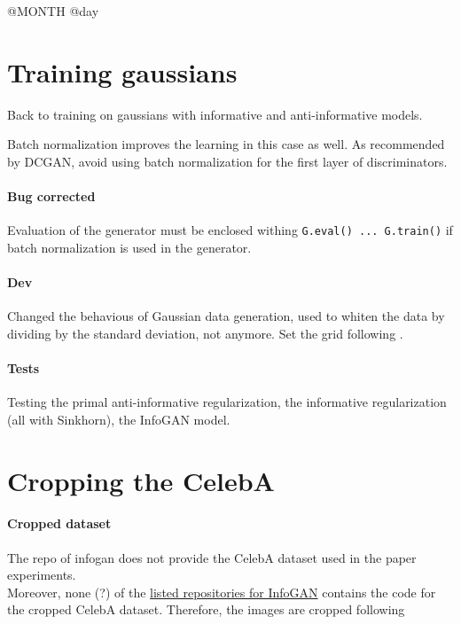 \documentclass[11pt,a4paper]{article}
\begin{document}

{\Huge @MONTH @day}

\section*{Training gaussians}

Back to training on gaussians with informative and anti-informative models.

Batch normalization improves the learning in this case as well. As recommended by DCGAN, avoid using batch normalization for the first layer of discriminators.

\paragraph{Bug corrected} Evaluation of the generator must be enclosed withing \texttt{G.eval() ... G.train()} if batch normalization is used in the generator.

\paragraph{Dev} Changed the behavious of Gaussian data generation, used to whiten the data
by dividing by the standard deviation, not anymore. Set the grid following
\cite{Dumoulin2016}.

\paragraph{Tests} Testing the primal anti-informative regularization, the informative regularization (all with Sinkhorn), the InfoGAN model.

\section*{Cropping the CelebA}

\paragraph{Cropped dataset}

The repo of infogan does not provide the CelebA dataset used in the paper
experiments. \\

Moreover, none (?) of the
\href{https://paperswithcode.com/paper/infogan-interpretable-representation-learning}{listed
repositories for InfoGAN} contains the code for the cropped CelebA dataset. Therefore,
the images are cropped following
\end{document}
